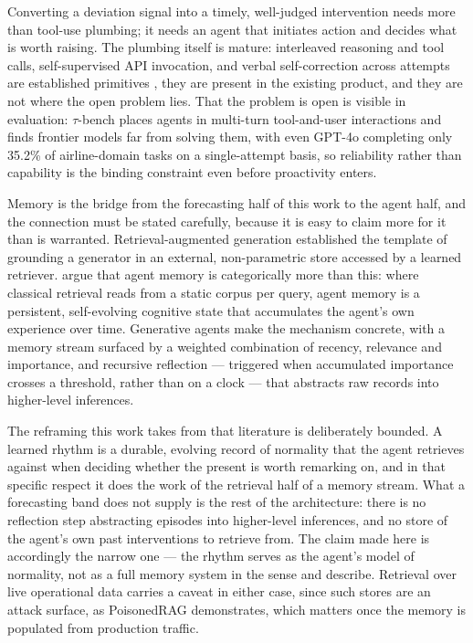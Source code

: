 Converting a deviation signal into a timely, well-judged intervention needs
more than tool-use plumbing; it needs an agent that initiates action and
decides what is worth raising. The plumbing itself is mature: interleaved
reasoning and tool calls, self-supervised API invocation, and verbal
self-correction across attempts are established primitives
\citep{yao_react_2022,schick_toolformer_2023,shinn_reflexion_2023}, they are
present in the existing product, and they are not where the open problem lies.
That the problem is open is visible in evaluation: $\tau$-bench
\citep[a 2024 preprint]{yao_-bench_2024} places agents in multi-turn
tool-and-user interactions and finds frontier models far from solving them,
with even GPT-4o completing only 35.2\% of airline-domain tasks on a
single-attempt basis, so reliability rather than capability is the binding
constraint even before proactivity enters.

Memory is the bridge from the forecasting half of this work to the agent half,
and the connection must be stated carefully, because it is easy to claim more
for it than is warranted. Retrieval-augmented generation
\citep{lewis_retrieval-augmented_2020} established the template of grounding a
generator in an external, non-parametric store accessed by a learned
retriever. \citet[a 2026 preprint]{hu_memory_2026} argue that agent memory is
categorically more than this: where classical retrieval reads from a static
corpus per query, agent memory is a persistent, self-evolving cognitive state
that accumulates the agent's own experience over time. Generative agents
\citep{park_generative_2023} make the mechanism concrete, with a memory stream
surfaced by a weighted combination of recency, relevance and importance, and
recursive reflection --- triggered when accumulated importance crosses a
threshold, rather than on a clock --- that abstracts raw records into
higher-level inferences.

The reframing this work takes from that literature is deliberately bounded. A
learned rhythm is a durable, evolving record of normality that the agent
retrieves against when deciding whether the present is worth remarking on, and
in that specific respect it does the work of the retrieval half of a memory
stream. What a forecasting band does not supply is the rest of the
architecture: there is no reflection step abstracting episodes into
higher-level inferences, and no store of the agent's own past interventions to
retrieve from. The claim made here is accordingly the narrow one --- the rhythm
serves as the agent's model of normality, not as a full memory system in the
sense \citet{hu_memory_2026} and \citet{park_generative_2023} describe.
Retrieval over live operational data carries a caveat in either case, since
such stores are an attack surface, as PoisonedRAG
\citep{zou_poisonedrag_2025} demonstrates, which matters once the memory is
populated from production traffic.

